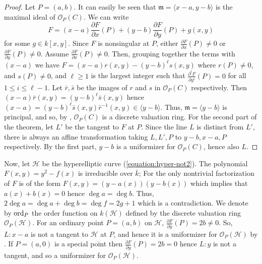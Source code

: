 \begin{proof}
Let $P = (a, b)$. It can easily be seen that $\mathfrak{m} = \langle x - a, y - b\rangle$ is the 
maximal ideal of $\mathcal{O}_P(C)$. We can write 
$$
F = (x - a)\frac{\partial F}{\partial x}(P) + (y - b)\frac{\partial F}{\partial y}(P) + g(x, y)
$$
for some $g \in k[x, y]$. Since $F$ is nonsingular at $P$, either $\frac{\partial F}{\partial x}(P) 
\ne 0$ or $\frac{\partial F}{\partial y}(P) \ne 0$. Assume $\frac{\partial F}{\partial x}(P) \ne 0$. 
Then, grouping together the terms with $(x - a)$ we have $F = (x - a)r(x, y) - (y - b)^\ell s(x, y)$ 
where $r(P) \ne 0$, and $s(P) \ne 0$, and $\ell \ge 1$ is the largest integer such that 
$\frac{\partial^i F}{\partial y^i}(P) = 0$ for all $1 \le i \le \ell - 1$. Let $\bar{r}, \bar{s}$ be 
the images of $r$ and $s$ in $\mathcal{O}_P(C)$ respectively. Then $(x - a)\bar{r}(x, y) = (y - 
b)^\ell\bar{s}(x, y)$ hence $(x - a) = (y - b)^\ell\bar{s}(x, y)\bar{r}^{-1}(x, y) \in \langle y - b 
\rangle$. Thus, $\mathfrak{m} = \langle y - b \rangle$ is principal, and so, by 
, $\mathcal{O}_P(C)$ is a discrete valuation ring. For the second 
part of the theorem, let $L'$ be the tangent to $F$ at $P$. Since the line $L$ is distinct from 
$L'$, there is always an affine transformation taking $L, L', P$ to $y - b, x - a, P$ respectively. 
By the first part, $y - b$ is a uniformizer for $\mathcal{O}_P(C)$, hence also $L$.  
\end{proof}
Now, let $\mathcal{H}$ be the hyperelliptic curve (\ref{equation:hyper-not2}). The polynomial $F(x, 
y) = y^2 - f(x)$ is irreducible over $\overline{k}$; For the only nontrivial factorization of $F$ is 
of the form $F(x, y) = (y - a(x))(y - b(x))$ which implies that $a(x) + b(x) = 0$ hence $\deg a = 
\deg b$. Thus, $2\deg a = \deg a + \deg b = \deg f = 2g + 1$ which is a contradiction. We denote by 
$\operatorname{ord}_{P}$  the order function on $k(\mathcal{H})$ defined by the discrete valuation ring 
$\mathcal{O}_P(\mathcal{H})$. For an ordinary point $P = (a, b)$ on $\mathcal{H}$, $\frac{\partial 
F}{\partial y}(P) = 2b \ne 0$. So, $L: x - a$ is not a tangent to $\mathcal{H}$ at $P$, and hence it 
is a uniformizer for $\mathcal{O}_P(\mathcal{H})$ by . If $P = (a, 0)$ is 
a special point then $\frac{\partial F}{\partial y}(P) = 2b = 0$ hence $L: y$ is not a tangent, and 
so a uniformizer for $\mathcal{O}_P(\mathcal{H})$. 

